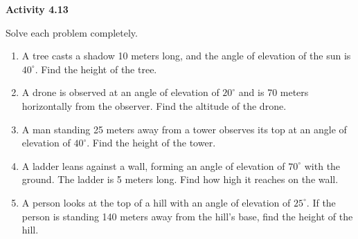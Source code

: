 \vspace{0.3ex}
\noindent\textbf{Activity 4.13}

\vspace{0.2ex}

Solve each problem completely.

\begin{enumerate}
    \item A tree casts a shadow 10 meters long, and the angle of elevation of the sun is \(40^\circ\). Find the height of the tree.
    \item A drone is observed at an angle of elevation of \(20^\circ\) and is 70 meters horizontally from the observer. Find the altitude of the drone.
    \item A man standing 25 meters away from a tower observes its top at an angle of elevation of \(40^\circ\). Find the height of the tower.
    \item A ladder leans against a wall, forming an angle of elevation of \(70^\circ\) with the ground. The ladder is 5 meters long. Find how high it reaches on the wall.
    \item A person looks at the top of a hill with an angle of elevation of \(25^\circ\). If the person is standing 140 meters away from the hill's base, find the height of the hill.
\end{enumerate}
